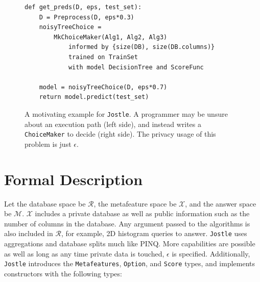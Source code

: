 \documentclass[11pt]{report}
\newcommand{\Jostle}{\texttt{Jostle}}
\renewcommand{\t}[1]{\texttt{#1}}
\begin{document}
\begin{figure}
\begin{minipage}{0.5\textwidth}
\begin{center}
\end{center}
\end{minipage}
\begin{minipage}{0.5\textwidth}
\begin{lstlisting}[style=MyPythonStyle]
def get_preds(D, eps, test_set):
    D = Preprocess(D, eps*0.3)
    noisyTreeChoice = 
        MkChoiceMaker(Alg1, Alg2, Alg3)
            informed by {size(DB), size(DB.columns)}
            trained on TrainSet 
            with model DecisionTree and ScoreFunc

    model = noisyTreeChoice(D, eps*0.7)
    return model.predict(test_set)
\end{lstlisting}
\end{minipage}
\caption{A motivating example for \Jostle{}. A programmer may be unsure about an execution path (left side), and instead writes a \t{ChoiceMaker} to decide (right side). The privacy usage of this problem is just $\epsilon$.}\label{fig:dtree_choices}
\end{figure}
\section{Formal Description}
Let the database space be $\mathcal{R}$, the metafeature space be $\mathcal{X}$, and the answer space be $\mathcal{M}$. $\mathcal{X}$ includes a private database as well as public information such as the number of columns in the database. Any argument passed to the algorithms is also included in $\mathcal{R}$, for example, 2D histogram queries to answer. \Jostle{} uses aggregations and database splits much like PINQ. More capabilities are possible as well as long as any time private data is touched, $\epsilon$ is specified. Additionally, \Jostle{} introduces the \t{Metafeatures}, \t{Option}, and \t{Score} types, and implements constructors with the following types:
\end{document}
